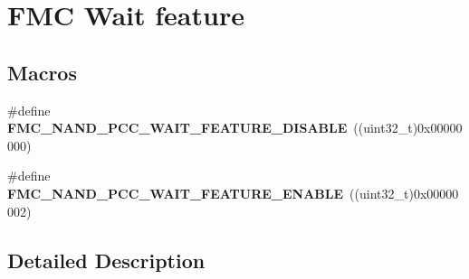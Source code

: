 \hypertarget{group___f_m_c___wait__feature}{}\section{F\+MC Wait feature}
\label{group___f_m_c___wait__feature}
\subsection*{Macros}
\begin{DoxyCompactItemize}
\item 
\#define {\bfseries F\+M\+C\+\_\+\+N\+A\+N\+D\+\_\+\+P\+C\+C\+\_\+\+W\+A\+I\+T\+\_\+\+F\+E\+A\+T\+U\+R\+E\+\_\+\+D\+I\+S\+A\+B\+LE}~((uint32\+\_\+t)0x00000000)\hypertarget{group___f_m_c___wait__feature_ga390be83c40398d8c27d7d7f0fad14214}{}\label{group___f_m_c___wait__feature_ga390be83c40398d8c27d7d7f0fad14214}

\item 
\#define {\bfseries F\+M\+C\+\_\+\+N\+A\+N\+D\+\_\+\+P\+C\+C\+\_\+\+W\+A\+I\+T\+\_\+\+F\+E\+A\+T\+U\+R\+E\+\_\+\+E\+N\+A\+B\+LE}~((uint32\+\_\+t)0x00000002)\hypertarget{group___f_m_c___wait__feature_ga7263dfab909a51eda8e496c8b176fce2}{}\label{group___f_m_c___wait__feature_ga7263dfab909a51eda8e496c8b176fce2}

\end{DoxyCompactItemize}


\subsection{Detailed Description}
